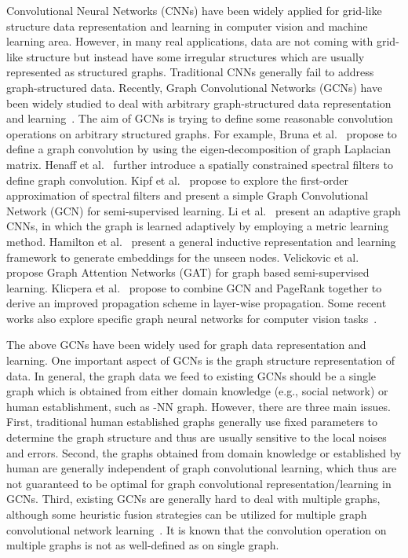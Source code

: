\documentclass{article}
\begin{document}
Convolutional Neural Networks (CNNs) have been widely applied for grid-like structure data representation and learning in computer vision and machine learning area. However, in many real applications, data are not coming with grid-like structure but instead have some irregular structures which are usually represented as structured graphs.
Traditional CNNs generally fail to  address graph-structured data. 
Recently, Graph Convolutional Networks (GCNs) have been widely studied  to deal with arbitrary graph-structured data representation and learning~\cite{defferrard2016convolutional,kipf2016semi,monti2017geometric,hamilton2017inductive,velickovic2017graph,DGI,CGNN}.
The aim of GCNs is trying to define some reasonable convolution operations  on arbitrary structured graphs.
For example,
Bruna et al.~\cite{bruna2014spectral} propose to define a  graph convolution by using the eigen-decomposition of graph Laplacian matrix.
Henaff et al.~\cite{henaff2015deep} further introduce a spatially constrained spectral filters to define graph convolution. Kipf et al.~\cite{kipf2016semi} propose to explore the first-order approximation of spectral filters and present a simple Graph Convolutional Network (GCN) for semi-supervised learning. Li et al.~\cite{velickovic2017graph} present an adaptive graph CNNs, in which the graph is learned adaptively by employing a metric learning method.
Hamilton et al.~\cite{hamilton2017inductive} present  a general inductive representation and learning framework to generate embeddings for the unseen nodes.
Velickovic et al.~\cite{velickovic2017graph} propose Graph Attention Networks (GAT) for graph based semi-supervised learning. Klicpera et al.~\cite{APPNN} propose to combine GCN and PageRank together to derive an improved propagation scheme in layer-wise propagation.
Some recent works also explore specific graph neural networks for computer vision tasks~\cite{GCN_CV3,GCN_CV1,GCN_CV2,te2018rgcnn}.







The above GCNs have been widely used for graph data representation and learning. One important aspect of GCNs is the graph structure representation of data. In general, the graph data we feed to existing GCNs should be a single graph which is obtained
from either domain knowledge ({e.g.}, social network) or human establishment, such as -NN graph.
However, there are three main issues.
First, traditional human established graphs generally use fixed parameters to determine the graph structure and thus are usually sensitive to the local noises and errors.
Second, the graphs obtained from domain knowledge or established by human are generally independent of graph convolutional learning, which thus are not guaranteed to be optimal for graph convolutional representation/learning in GCNs.
Third, existing GCNs are generally hard to deal with multiple graphs, although some heuristic fusion strategies can be utilized for multiple graph convolutional network learning~\cite{simonovsky2017dynamic,schlichtkrull2018modeling,zhuang2018dual}.
It is known that the convolution operation on multiple graphs is not as well-defined as on single graph.
\end{document}
